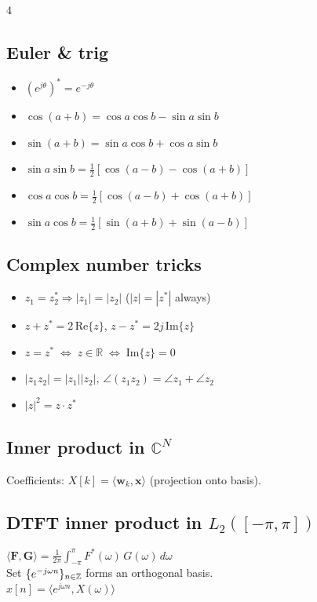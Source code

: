 \documentclass[8pt,a4paper,landscape]{extarticle}
\begin{document}
\begin{multicols*}{4}
\subsection{Euler \& trig}
\begin{itemize}

  \item $(e^{j\theta})^* = e^{-j\theta}$
  \item $\cos(a+b)=\cos a\cos b - \sin a\sin b$
  \item $\sin(a+b)=\sin a\cos b + \cos a\sin b$
  \item $\sin a\sin b = \tfrac{1}{2}[\cos(a-b)-\cos(a+b)]$
  \item $\cos a\cos b = \tfrac{1}{2}[\cos(a-b)+\cos(a+b)]$
  \item $\sin a\cos b = \tfrac{1}{2}[\sin(a+b)+\sin(a-b)]$
\end{itemize}

\subsection{Complex number tricks}
\begin{itemize}
  \item $z_1 = z_2^* \Rightarrow |z_1|=|z_2|$ \quad ($|z|=|z^*|$ always)
  \item $z + z^* = 2\,\mathrm{Re}\{z\}$, \quad $z - z^* = 2j\,\mathrm{Im}\{z\}$
  \item $z = z^* \;\Longleftrightarrow\; z\in\mathbb{R} \;\Longleftrightarrow\; \mathrm{Im}\{z\}=0$
  \item $|z_1 z_2| = |z_1||z_2|$, \quad $\angle(z_1 z_2) = \angle z_1 + \angle z_2$
  \item $|z|^2 = z\cdot z^*$
\end{itemize}

\subsection{\texorpdfstring{Inner product in $\mathbb{C}^N$}{Inner product in CN}}
Coefficients: $X[k]=\langle\mathbf{w}_k,\mathbf{x}\rangle$ (projection onto basis).

\subsection{{DTFT inner product in \texorpdfstring{$L_2([-\pi,\pi])$}{L2([-pi,pi])}}}
$\langle\mathbf{F},\mathbf{G}\rangle = \frac{1}{2\pi}\int_{-\pi}^{\pi}F^*(\omega)\,G(\omega)\,d\omega$\\
Set $\{e^{-j\omega n}\}_{n\in\mathbb{Z}}$ forms an orthogonal basis.\\
$x[n] = \langle e^{j\omega n}, X(\omega)\rangle$


\end{multicols*}
\end{document}
